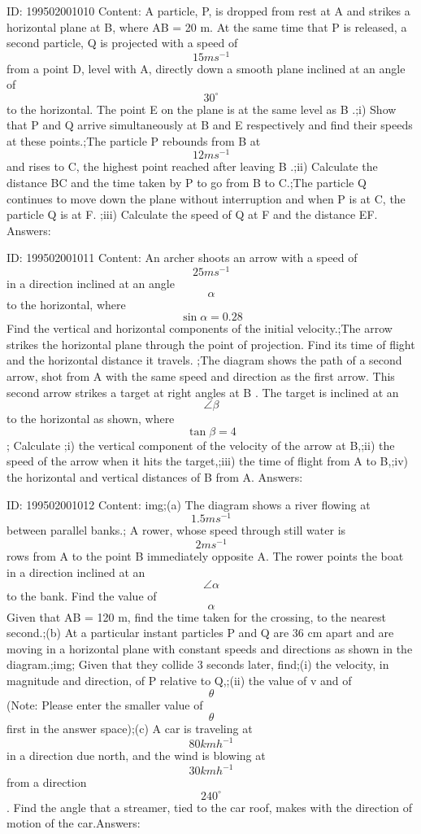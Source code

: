 \documentclass{article}
\begin{document}
ID: 199502001010
Content:
A particle, P, is dropped from rest at A and strikes a horizontal plane at B, where AB = 20 m. At the same time that P is released, a second particle, Q is projected with a speed of \[15ms^{-1} \]  from a point D, level with A, directly down a smooth plane inclined at an angle of \[30^{\circ}\] to the horizontal. The point E on the plane is at the same level as B .;i) Show that P and Q arrive simultaneously at B and E respectively and find their speeds at these points.;The particle P rebounds from B at \[12ms^{-1} \] and rises to C, the highest point reached after leaving B .;ii) Calculate the distance BC and the time taken by P to go from B to C.;The particle Q continues to move down the plane without interruption and when P is at C, the particle Q is at F.  ;iii) Calculate the speed of Q at F and the distance EF.
Answers:

ID: 199502001011
Content:
An archer shoots an arrow with a speed of \[25ms^{-1} \] in a direction inclined at an angle\[\alpha\] to the horizontal, where \[\sin \alpha  = 0.28\] Find the vertical and horizontal components of the initial velocity.;The arrow strikes the horizontal plane through the point of projection. Find its time of flight and the horizontal distance it travels. ;The diagram shows the path of a second arrow, shot from A with the same speed and direction as the first arrow. This second arrow strikes a target at right angles at B . The target is inclined at an \[\angle \beta \] to the horizontal as shown, where \[\tan \beta =4\] ; Calculate ;i) the vertical component of the velocity of the arrow at B,;ii) the speed of the arrow when it hits the target,;iii) the time of flight from A to B,;iv) the horizontal and vertical distances of B from A. Answers:

ID: 199502001012
Content:
img;(a) The diagram shows a river flowing at \[1.5 ms^{-1}\] between parallel banks.; A rower, whose speed through still water is \[2 ms^{-1}\] rows from A to the point B immediately opposite A. The rower points the boat in a direction inclined at an \[\angle \alpha \] to the bank. Find the value of \[\alpha \] Given that AB = 120 m, find the time taken for the crossing, to the nearest second.;(b) At a particular instant particles P and Q are 36 cm apart and are moving in a horizontal plane with constant speeds and directions as shown in the diagram.;img; Given that they collide 3 seconds later, find;(i) the velocity, in magnitude and direction, of P relative to Q,;(ii) the value of v and of \[\theta\] (Note: Please enter the smaller value of \[\theta\] first in the answer space);(c) A car is traveling at \[80 kmh ^{-1}\] in a direction due north, and the wind is blowing at \[30 kmh ^{-1}\] from a direction \[240^{\circ}\].  Find the angle that a streamer, tied to the car roof, makes with the direction of motion of the car.Answers:
\end{document}

